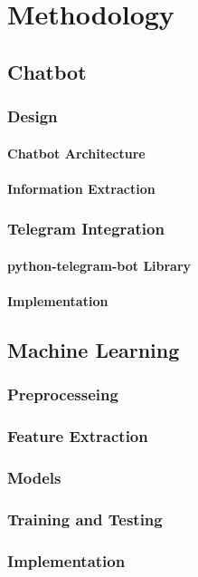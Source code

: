 
\chapter{Methodology}\label{chapter:methodology}

\section{Chatbot}
\subsection{Design}
\subsubsection{Chatbot Architecture}
\subsubsection{Information Extraction}
\subsection{Telegram Integration}
\subsubsection{python-telegram-bot Library}
\subsubsection{Implementation}
\section{Machine Learning}
\subsection{Preprocesseing}
\subsection{Feature Extraction}
\subsection{Models}
\subsection{Training and Testing}
\subsection{Implementation}

